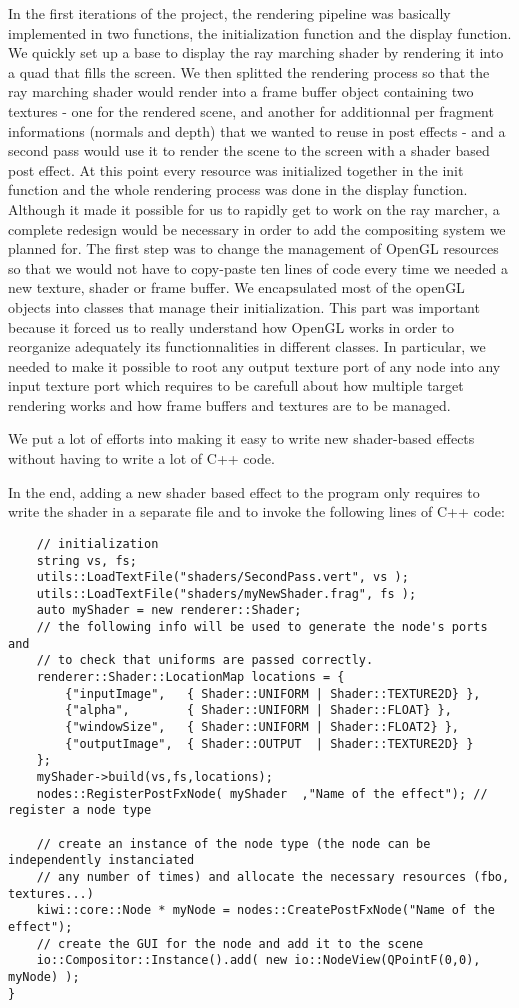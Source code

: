 In the first iterations of the project, the rendering pipeline was basically implemented
in two functions, the initialization function and the display function. We quickly
set up a base to display the ray marching shader by rendering it into a quad that
fills the screen. We then splitted the rendering process so that the ray marching
shader would render into a frame buffer object containing two textures - one for
the rendered scene, and another for additionnal per fragment informations (normals and depth)
that we wanted to reuse in post effects - and a second pass would use it to render
the scene to the screen with a shader based post effect. At this point every
resource was initialized together in the init function and the whole rendering
process was done in the display function. Although it made it possible for us to
rapidly get to work on the ray marcher, a complete redesign would be necessary in
order to add the compositing system we planned for. The first step was to change
the management of OpenGL resources so that we would not have to copy-paste ten lines
of code every time we needed a new texture, shader or frame buffer. We encapsulated
most of the openGL objects into classes that manage their initialization. This part
was important because it forced us to really understand how OpenGL works in order
to reorganize adequately its functionnalities in different classes. In particular,
we needed to make it possible to root any output texture port of any node into any input
texture port which requires to be carefull about how multiple target rendering works
and how frame buffers and textures are to be managed.

We put a lot of efforts into making it easy to write new shader-based effects without
having to write a lot of C++ code.

In the end, adding a new shader based effect to the program only requires to write
the shader in a separate file and to invoke the following lines of C++ code:
\begin{lstlisting}
    // initialization
    string vs, fs;
    utils::LoadTextFile("shaders/SecondPass.vert", vs );
    utils::LoadTextFile("shaders/myNewShader.frag", fs );
    auto myShader = new renderer::Shader;
    // the following info will be used to generate the node's ports and
    // to check that uniforms are passed correctly.
    renderer::Shader::LocationMap locations = {
        {"inputImage",   { Shader::UNIFORM | Shader::TEXTURE2D} },
        {"alpha",        { Shader::UNIFORM | Shader::FLOAT} },
        {"windowSize",   { Shader::UNIFORM | Shader::FLOAT2} },
        {"outputImage",  { Shader::OUTPUT  | Shader::TEXTURE2D} }
    };
    myShader->build(vs,fs,locations);
    nodes::RegisterPostFxNode( myShader  ,"Name of the effect"); // register a node type

    // create an instance of the node type (the node can be independently instanciated
    // any number of times) and allocate the necessary resources (fbo, textures...)
    kiwi::core::Node * myNode = nodes::CreatePostFxNode("Name of the effect");
    // create the GUI for the node and add it to the scene
    io::Compositor::Instance().add( new io::NodeView(QPointF(0,0), myNode) );
}
\end{lstlisting}


